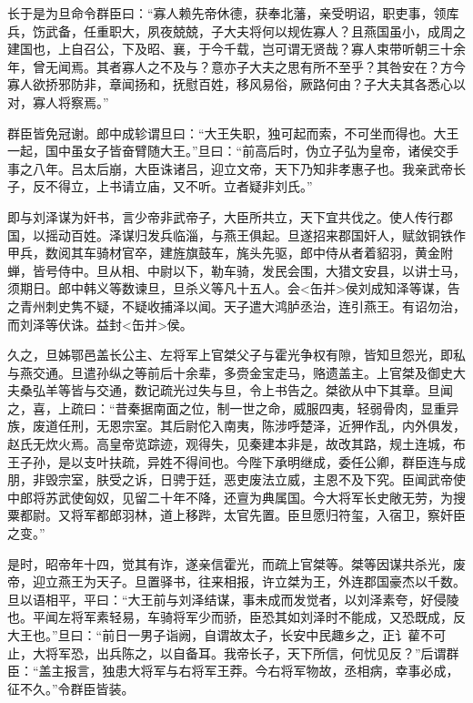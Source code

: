 \documentclass[]{article}
\begin{document}
长于是为旦命令群臣曰：``寡人赖先帝休德，获奉北藩，亲受明诏，职吏事，领库兵，饬武备，任重职大，夙夜兢兢，子大夫将何以规佐寡人？且燕国虽小，成周之建国也，上自召公，下及昭、襄，于今千载，岂可谓无贤哉？寡人束带听朝三十余年，曾无闻焉。其者寡人之不及与？意亦子大夫之思有所不至乎？其咎安在？方今寡人欲挢邪防非，章闻扬和，抚慰百姓，移风易俗，厥路何由？子大夫其各悉心以对，寡人将察焉。''

群臣皆免冠谢。郎中成轸谓旦曰：``大王失职，独可起而索，不可坐而得也。大王一起，国中虽女子皆奋臂随大王。''旦曰：``前高后时，伪立子弘为皇帝，诸侯交手事之八年。吕太后崩，大臣诛诸吕，迎立文帝，天下乃知非孝惠子也。我亲武帝长子，反不得立，上书请立庙，又不听。立者疑非刘氏。''

即与刘泽谋为奸书，言少帝非武帝子，大臣所共立，天下宜共伐之。使人传行郡国，以摇动百姓。泽谋归发兵临淄，与燕王俱起。旦遂招来郡国奸人，赋敛铜铁作甲兵，数阅其车骑材官卒，建旌旗鼓车，旄头先驱，郎中侍从者着貂羽，黄金附蝉，皆号侍中。旦从相、中尉以下，勒车骑，发民会围，大猎文安县，以讲士马，须期日。郎中韩义等数谏旦，旦杀义等凡十五人。会\textless{}缶并\textgreater{}侯刘成知泽等谋，告之青州刺史隽不疑，不疑收捕泽以闻。天子遣大鸿胪丞治，连引燕王。有诏勿治，而刘泽等伏诛。益封\textless{}缶并\textgreater{}侯。

久之，旦姊鄂邑盖长公主、左将军上官桀父子与霍光争权有隙，皆知旦怨光，即私与燕交通。旦遣孙纵之等前后十余辈，多赍金宝走马，赂遗盖主。上官桀及御史大夫桑弘羊等皆与交通，数记疏光过失与旦，令上书告之。桀欲从中下其章。旦闻之，喜，上疏曰：``昔秦据南面之位，制一世之命，威服四夷，轻弱骨肉，显重异族，废道任刑，无恩宗室。其后尉佗入南夷，陈涉呼楚泽，近狎作乱，内外俱发，赵氏无炊火焉。高皇帝览踪迹，观得失，见秦建本非是，故改其路，规土连城，布王子孙，是以支叶扶疏，异姓不得间也。今陛下承明继成，委任公卿，群臣连与成朋，非毁宗室，肤受之诉，日骋于廷，恶吏废法立威，主恩不及下究。臣闻武帝使中郎将苏武使匈奴，见留二十年不降，还亶为典属国。今大将军长史敞无劳，为搜粟都尉。又将军都郎羽林，道上移跸，太官先置。臣旦愿归符玺，入宿卫，察奸臣之变。''

是时，昭帝年十四，觉其有诈，遂亲信霍光，而疏上官桀等。桀等因谋共杀光，废帝，迎立燕王为天子。旦置驿书，往来相报，许立桀为王，外连郡国豪杰以千数。旦以语相平，平曰：``大王前与刘泽结谋，事未成而发觉者，以刘泽素夸，好侵陵也。平闻左将军素轻易，车骑将军少而骄，臣恐其如刘泽时不能成，又恐既成，反大王也。''旦曰：``前日一男子诣阙，自谓故太子，长安中民趣乡之，正讠雚不可止，大将军恐，出兵陈之，以自备耳。我帝长子，天下所信，何忧见反？''后谓群臣：``盖主报言，独患大将军与右将军王莽。今右将军物故，丞相病，幸事必成，征不久。''令群臣皆装。
\end{document}
